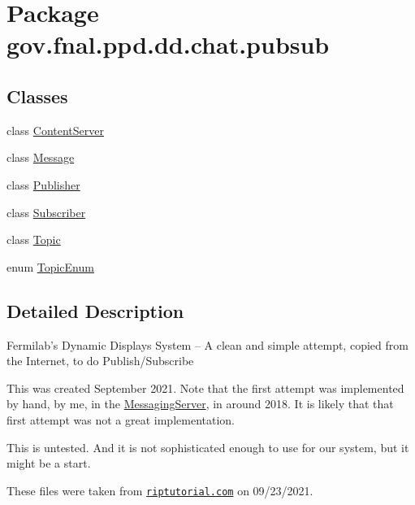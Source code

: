 \hypertarget{namespacegov_1_1fnal_1_1ppd_1_1dd_1_1chat_1_1pubsub}{\section{Package gov.\-fnal.\-ppd.\-dd.\-chat.\-pubsub}
\label{namespacegov_1_1fnal_1_1ppd_1_1dd_1_1chat_1_1pubsub}
}
\subsection*{Classes}
\begin{DoxyCompactItemize}
\item 
class \hyperlink{classgov_1_1fnal_1_1ppd_1_1dd_1_1chat_1_1pubsub_1_1ContentServer}{Content\-Server}
\item 
class \hyperlink{classgov_1_1fnal_1_1ppd_1_1dd_1_1chat_1_1pubsub_1_1Message}{Message}
\item 
class \hyperlink{classgov_1_1fnal_1_1ppd_1_1dd_1_1chat_1_1pubsub_1_1Publisher}{Publisher}
\item 
class \hyperlink{classgov_1_1fnal_1_1ppd_1_1dd_1_1chat_1_1pubsub_1_1Subscriber}{Subscriber}
\item 
class \hyperlink{classgov_1_1fnal_1_1ppd_1_1dd_1_1chat_1_1pubsub_1_1Topic}{Topic}
\item 
enum \hyperlink{enumgov_1_1fnal_1_1ppd_1_1dd_1_1chat_1_1pubsub_1_1TopicEnum}{Topic\-Enum}
\end{DoxyCompactItemize}


\subsection{Detailed Description}
Fermilab's Dynamic Displays System -- A clean and simple attempt, copied from the Internet, to do Publish/\-Subscribe 

This was created September 2021. Note that the first attempt was implemented by hand, by me, in the \hyperlink{classgov_1_1fnal_1_1ppd_1_1dd_1_1chat_1_1MessagingServer}{Messaging\-Server}, in around 2018. It is likely that that first attempt was not a great implementation. 

This is untested. And it is not sophisticated enough to use for our system, but it might be a start. 

These files were taken from \href{https://riptutorial.com/design-patterns/example/6498/publish-subscribe-in-java}{\tt riptutorial.\-com} on 09/23/2021. 